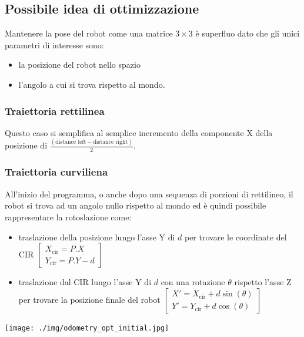\documentclass[11pt]{article}
\begin{document}
\subsection{Possibile idea di ottimizzazione}
\label{sec:orgeee593f}
Mantenere la pose del robot come una matrice \(3\times 3\) è superfluo dato che gli unici parametri di interesse sono:
\begin{itemize}
\item la posizione del robot nello spazio
\item l'angolo a cui si trova rispetto al mondo.
\end{itemize}
\subsubsection{Traiettoria rettilinea}
\label{sec:org913d27f}
Questo caso si semplifica al semplice incremento della componente X della posizione di \(\frac{(\text{distance left} - \text{distance right})}{2}\).
\subsubsection{Traiettoria curviliena}
\label{sec:org4c7050c}
All'inizio del programma, o anche dopo una sequenza di porzioni di rettilineo, il robot si trova ad un angolo nullo rispetto al mondo ed è quindi possibile rappresentare la rotoslazione come:
\begin{itemize}
\item traslazione della posizione lungo l'asse Y di \(d\) per trovare le coordinate del CIR \(\begin{bmatrix}X_\text{cir}=P.X\\Y_\text{cir}=P.Y-d\end{bmatrix}\)
\item traslazione dal CIR lungo l'asse Y di \(d\) con una rotazione \(\theta\) rispetto l'asse Z per trovare la posizione finale del robot \(\begin{bmatrix}X'=X_\text{cir}+d\sin(\theta)\\Y'=Y_\text{cir}+d\cos(\theta)\end{bmatrix}\)
\end{itemize}
\begin{center}
\texttt{[image: ./img/odometry\_opt\_initial.jpg]}
\end{center}
\end{document}
